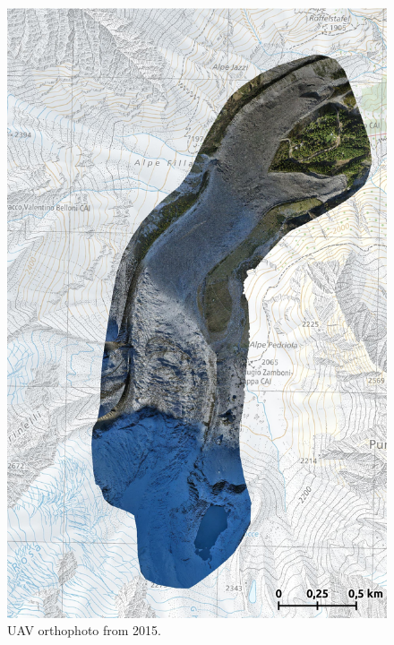 \begin{figure}[p]
    \centering
    \includegraphics[height=\textheight]{figures/appendix/orto_2015.jpg}
    \caption[]{UAV orthophoto from 2015.}
\end{figure}

